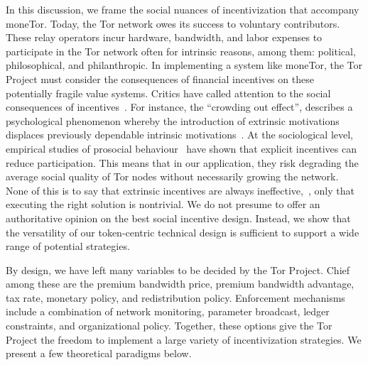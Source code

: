 In this discussion, we frame the social nuances of incentivization that accompany moneTor.
Today, the Tor network owes its success to voluntary contributors.
These relay operators incur hardware, bandwidth, and labor expenses to participate in the Tor network often for intrinsic reasons, among them: political, philosophical, and philanthropic.
In implementing a system like moneTor, the Tor Project must consider the consequences of financial incentives on these potentially fragile value systems.
Critics have called attention to the social consequences of incentives~\cite{jansenblogpost}.
For instance, the ``crowding out effect'', describes a psychological phenomenon whereby the introduction of extrinsic motivations displaces previously dependable intrinsic motivations~\cite{10.1257/jep.25.4.191}.
At the sociological level, empirical studies of prosocial behaviour~\cite{10.1257/aer.96.5.1652} have shown that explicit incentives can reduce participation.
This means that in our application, they risk degrading the average social quality of Tor nodes without necessarily growing the network.
None of this is to say that extrinsic incentives are always ineffective,~\cite{10.1257/aer.96.5.1652}, only that executing the right solution is nontrivial.
We do not presume to offer an authoritative opinion on the best social incentive design.
Instead, we show that the versatility of our token-centric technical design is sufficient to support a wide range of potential strategies.

By design, we have left many variables to be decided by the Tor Project.
Chief among these are the premium bandwidth price, premium bandwidth advantage, tax rate, monetary policy, and redistribution policy.
Enforcement mechanisms include a combination of network monitoring, parameter broadcast, ledger constraints, and organizational policy.
Together, these options give the Tor Project the freedom to implement a large variety of incentivization strategies.
We present a few theoretical paradigms below.

